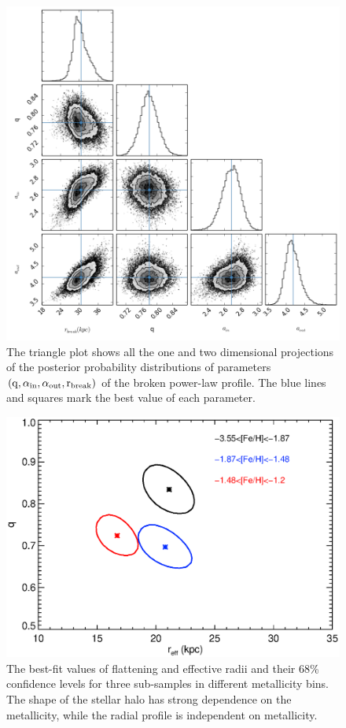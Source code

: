 \documentclass[12pt,preprint]{aastex}
\begin{document}
\begin{figure}[htbp]
\centering
\includegraphics[width=\textwidth]{trianglebpl}
\caption{The triangle plot shows all the one and two dimensional projections of the posterior probability distributions of parameters $\rm (q,\alpha_{in},\alpha_{out},r_{break})$ of the broken power-law profile. The blue lines and squares mark the best value of each parameter.}
\label{f:fbpl}
\end{figure}

\begin{figure}[htbp]
\centering
\includegraphics[width=\textwidth]{doublehp_reffqfehbin_Nov12014_einasto_pts96_fixn_contour}
\caption{The best-fit values of flattening and effective radii and their 68\% confidence levels for three sub-samples in different metallicity bins. The shape of the stellar halo has strong dependence on the metallicity, while the radial profile is independent on metallicity.}
\label{f:ffehdependence}
\end{figure}
\end{document}
